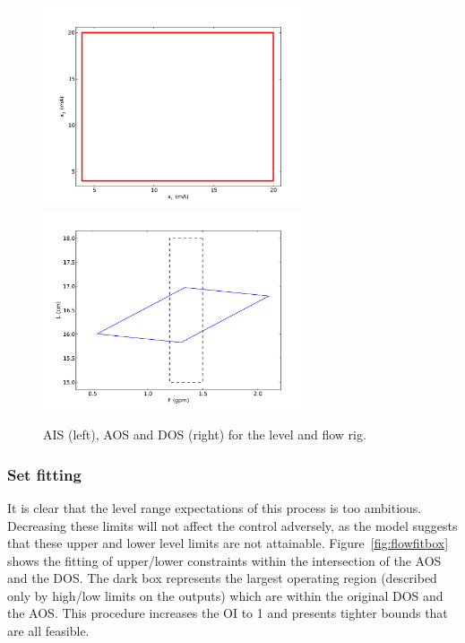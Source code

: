 \begin{figure}[htbp]
  \centering
    \includegraphics[width=7.8cm]{graph/flowais.pdf}
    \includegraphics[width=7.8cm]{graph/flowaos.pdf}
  \caption[AIS, AOS and DOS of the level and flow rig]{AIS (left), AOS and DOS (right) for the level and flow rig.}
  \label{fig:flowaisaos}
\end{figure}

\subsubsection{Set fitting}
It is clear that the level range expectations of this process is too ambitious.
Decreasing these limits will not affect the control adversely, as the model suggests that these upper and lower level limits are not attainable.
Figure~\ref{fig:flowfitbox} shows the fitting of upper/lower constraints within the intersection of the AOS and the DOS.
The dark box represents the largest operating region (described only by high/low limits on the outputs) which are within the original DOS and the AOS.
This procedure increases the OI to 1 and presents tighter bounds that are all feasible.

